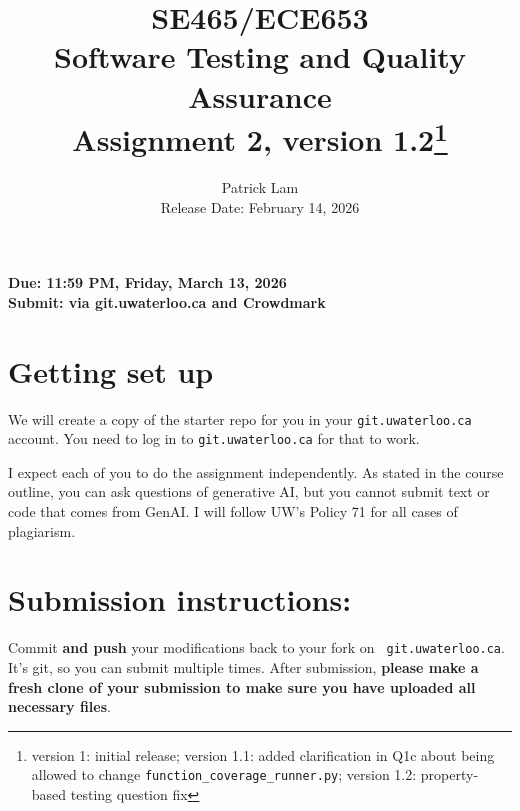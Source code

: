 \documentclass[10pt,hidelinks]{article}
\begin{document}
\title{
SE465/ECE653 \\
Software Testing and Quality Assurance\\
Assignment 2, version 1.2\footnote{version 1: initial release; version 1.1: added clarification in Q1c about being allowed to change \texttt{function\_coverage\_runner.py}; version 1.2: property-based testing question fix}}
\author{Patrick Lam \\
{Release Date:  February 14, 2026} \\
}
\renewcommand{\today}{}
\maketitle

\begin{center}

{\bf Due:  11:59 PM, Friday, March 13, 2026} \\
{\bf Submit: via git.uwaterloo.ca and Crowdmark}\\
\end{center}

\section*{Getting set up}
We will create a copy of the starter repo for you in your {\tt git.uwaterloo.ca} account. You need to log in to {\tt git.uwaterloo.ca} for that to work.



I expect each of you to do the assignment independently. As stated in the course outline, you can ask questions of generative AI, but you cannot submit text or code that comes from GenAI. I will follow UW's Policy 71 for all cases of plagiarism.
 
 \section*{Submission instructions:} 
Commit {\bf and push} your modifications back to your fork on {\tt
  git.uwaterloo.ca}.  It's git, so you can submit multiple times. After
submission, {\bf please make a fresh clone of your submission to make sure you
  have uploaded all necessary files}.
 
\end{document}
